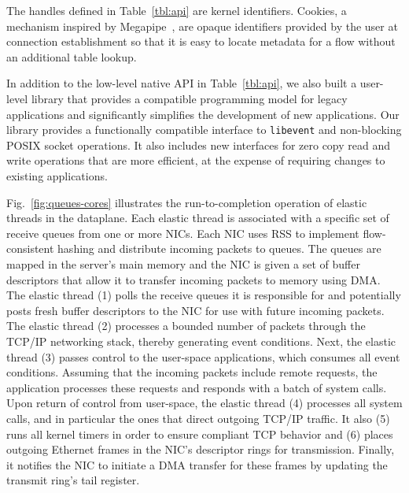  The handles defined in Table~\ref{tbl:api} are kernel
identifiers. Cookies, a mechanism inspired by Megapipe~\cite{han2012megapipe},
are opaque identifiers provided by the user at connection establishment
so that it is easy to locate metadata for a flow without an additional table lookup.


In addition to the low-level native \ix API in Table~\ref{tbl:api}, we
also built a user-level library that provides a compatible programming
model for legacy applications and significantly simplifies the
development of new applications. Our library provides a functionally
compatible interface to \texttt{libevent} and non-blocking POSIX
socket operations. It also includes new interfaces for zero copy read
and write operations that are more efficient, at the expense of
requiring changes to existing applications. 

 

Fig.~\ref{fig:queues-cores} illustrates the run-to-completion
operation of elastic threads in the \ix dataplane. Each elastic thread
is associated with a specific set of receive queues from one or more
NICs. Each NIC uses RSS to implement flow-consistent hashing and
distribute incoming packets to queues. The queues are mapped in the
server's main memory and the NIC is given a set of buffer descriptors
that allow it to transfer incoming packets to memory using DMA\@.  The
elastic thread (1) polls the receive queues it is responsible for and
potentially posts fresh buffer descriptors to the NIC for use with
future incoming packets. The elastic thread (2) processes a bounded
number of packets through the TCP/IP networking stack, thereby
generating event conditions. Next, the elastic thread (3) passes
control to the user-space applications, which consumes all event
conditions. Assuming that the incoming packets include remote
requests, the application processes these requests and responds with a
batch of system calls. Upon return of control from user-space, the
elastic thread (4) processes all system calls, and in particular the
ones that direct outgoing TCP/IP traffic. It also (5) runs all kernel
timers in order to ensure compliant TCP behavior and (6) places
outgoing Ethernet frames in the NIC's descriptor rings for
transmission. Finally, it notifies the NIC to initiate a DMA transfer
for these frames by updating the transmit ring's tail register.

